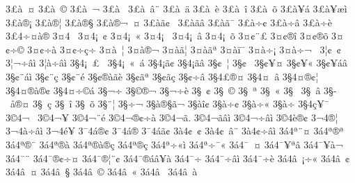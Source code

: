 {3^^a3^^e0^^a0^^a4
3^^a3^^e0^^a0^^a9
3^^a3^^e0^^a0^^ac
3^^a3^^e0^^a0^^ad
3^^a3^^e0^^a0^^e2^^a8
3^^a3^^e0^^a0^^e4
3^^a3^^e0^^a0^^e8
3^^a3^^e0^^a0^^ee
3^^a3^^e0^^a0^^f5
3^^a3^^e0^^a5^^e1
3^^a3^^e0^^a5^^e6^^ec
3^^a3^^e0^^ae^^a1
3^^a3^^e0^^ae^^a6
3^^a3^^e0^^ae^^a7
3^^a3^^e0^^ae^^ac^^a0^^a4
3^^a3^^e0^^e3^^a2^^a0^^ad
3^^a3^^e0^^e3^^ad^^e2
3^^a3^^e0^^e3^^af
3^^a3^^e0^^f7^^a2
3^^a3^^e0^^f7^^e2
3^^a3^^e0^^f7^^e8
3^^a34^^f7^^a4^^e0^^ae
3^^a44^^a0^^ad
3^^a44^^a1^^a0^^a2
3^^a44^^a1^^a0^^ab
3^^a44^^a1^^a0^^ad
3^^a44^^a1^^a0^^e2
3^^a44^^a1^^a0^^f5
3^^a4^^a2^^a8^^a3
3^^a4^^a2^^ae^^ee
3^^a4^^a2^^ae^^f5
3^^a4^^a2^^f7^^a9
3^^a4^^a2^^f7^^e0
3^^a4^^a2^^f7^^e7^^f7
3^^a4^^e0^^a0^^a6
3^^a4^^e0^^ae^^ac
3^^a4^^e0^^e3^^a6
3^^a4^^e0^^e3^^aa
3^^a4^^e0^^ef^^af
3^^a4^^e0^^f7^^a1
3^^a4^^e0^^f7^^ac^^a0
3^^a6^^a2^^a0^^a2
3^^a6^^ac^^f7^^e2^^ec
3^^a6^^e0^^f7^^e2^^ec
3^^a74^^a1^^a0^^a3^^a0
3^^a74^^a1^^a0^^ab^^a0^^ad^^e1
3^^a74^^a1^^e3^^a2
3^^a74^^a1^^e3^^e2
3^^a7^^a2^^a0^^a6
3^^a7^^a2^^a0^^ad
3^^a7^^a2^^a5^^a4
3^^a7^^a2^^a5^^ab
3^^a7^^a2^^a5^^e1^^e2
3^^a7^^a2^^a8^^e1^^ec 
3^^a7^^a2^^a8^^e7
3^^a7^^a2^^a8^^e9
3^^a7^^a2^^ae^^e0^^e3^^e8
3^^a7^^a2^^e3^^aa
3^^a7^^a2^^e3^^e7
3^^a7^^a2^^f7^^e2     
3^^a74^^a3^^ae^^a4     
3^^a74^^a4^^a0^^e2
3^^a74^^a4^^ae^^a2^^a6
3^^a74^^a4^^ae^^e0^^ae^^a2
3^^a74^^a4^^f7^^a9^^e1^^ad
3^^a7^^ac^^f7^^ad
3^^a7^^a9^^ae^^ac
3^^a7^^ac^^f7^^e8
3^^a7^^ad^^a0^^a2
3^^a7^^ad^^a0^^a9
3^^a7^^ad^^a0^^aa
3^^a7^^ad^^a0^^ab
3^^a7^^ad^^a0^^ad
3^^a7^^ad^^a0^^e2
3^^a7^^ad^^a0^^e5^^ae^^a4
3^^a7^^ad^^a0^^e7
3^^a7^^ad^^a0^^ee
3^^a7^^ad^^a0^^f5
3^^a7^^ad^^a8^^a6
3^^a7^^ad^^f7^^ac
3^^a7^^e0^^ae^^a7^^e3^^ac
3^^a7^^e0^^ee^^a2 
3^^a7^^e0^^f7^^a2 
3^^a7^^e0^^f7^^ab 
3^^a7^^e0^^f7^^ad 
3^^a74^^e7^^a5^^af
3^^a94^^ac^^a0
3^^a94^^ac^^a5^^ad^^ad
3^^a94^^ac^^a8^^e9
3^^a94^^ac^^ae^^a2^^f7^^e0^^ad
3^^a94^^ac^^e3.
3^^a94^^ac^^e3^^e2^^ec
3^^a94^^ac^^f7^^e2^^ec
3^^a94^^e8^^ae^^a2
3^^ac4^^ad^^ae^^a6
3^^ac4^^e0^^f7^^e2^^ec
3^^ac4^^e9^^a5^^ad
3^^af4^^e1^^ae^^a2
3^^af4^^e1^^ae^^ad
3^^af4^^e1^^e3^^a2
3^^e04^^a2^^a0^^a2
3^^e04^^a2^^a0^^e2^^a8
3^^e04^^a2^^f7^^e2^^ec
3^^e14^^aa^^a8^^a4
3^^e14^^aa^^ae^^aa
3^^e14^^aa^^ae^^af     
3^^e14^^aa^^ae^^e0
3^^e14^^aa^^ae^^e0^^ae^^e7
3^^e14^^aa^^ae^^e7     
3^^e14^^aa^^f7^^ab^^ec
3^^e14^^aa^^f7^^af^^ab
3^^e14^^af^^a0^^a4
3^^e14^^af^^a5^^aa^^e2
3^^e14^^af^^a5^^e0^^ac
3^^e14^^af^^a8^^ad
3^^e14^^af^^ae^^a2^^f7^^a4
3^^e14^^af^^ae^^a6^^a8^^a2
3^^e14^^af^^ae^^e1^^e2^^a5^^e0
3^^e14^^af^^f7
3^^e14^^af^^f7^^e2^^ec
3^^e14^^af^^f7^^e8
3^^e14^^e2^^a0^^a1^^f7^^ab 
3^^e14^^e2^^a0^^a2 
3^^e14^^e2^^a0^^a4 
3^^e14^^e2^^a0^^a7
3^^e14^^e2^^a0^^a9^^ad
3^^e14^^e2^^a0^^ab
3^^e14^^e2^^a0^^ad
3^^e14^^e2^^a0^^e0
}
